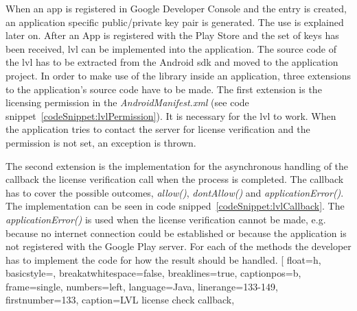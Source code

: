 When an app is registered in Google Developer Console and the entry is created, an application specific public/private key pair is generated.
The use is explained later on. \cite{developersLicensingSetup}
\newline
After an App is registered with the Play Store and the set of keys has been received, \gls{lvl} can be implemented into the application.
The source code of the \gls{lvl} has to be extracted from the Android \gls{sdk} and moved to the application project.
In order to make use of the library inside an application, three extensions to the application's source code have to be made.
 \cite{digipomLvl} \cite{developersLicensingOverview}
\newline
The first extension is the licensing permission in the \textit{AndroidManifest.xml} (see code snippet~\ref{codeSnippet:lvlPermission}).
It is necessary for the \gls{lvl} to work.
When the application tries to contact the server for license verification and the permission is not set, an exception is thrown. \cite{developersLicensingSetup} \cite{developersLicensingAdding}
\newline

The second extension is the implementation for the asynchronous handling of the callback the license verification call when the process is completed.
The callback has to cover the possible outcomes, \textit{allow()}, \textit{dontAllow()} and \textit{applicationError()}.
The implementation can be seen in code snipped~\ref{codeSnippet:lvlCallback}.
The \textit{applicationError()} is used when the license verification cannot be made, e.g. because no internet connection could be established or because the application is not registered with the Google Play server.
For each of the methods the developer has to implement the code for how the result should be handled. \cite{developersLicensingOverview} \cite{developersLicensingSetup} \cite{developersLicensingAdding} \cite{digipomLvl}
\newline
[
  float=h,
  basicstyle=\footnotesize,
  breakatwhitespace=false,
  breaklines=true,
  captionpos=b,
  frame=single,
  numbers=left,
  language=Java,
  linerange={133-149},
  firstnumber=133,
  caption={LVL license check callback},
